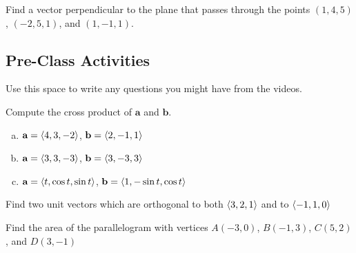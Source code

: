 \documentclass[notes]{subfiles}
\begin{document}
		\begin{ex}
			Find a vector perpendicular to the plane that passes through the points $(1,4,5)$, $(-2,5,1)$, and $(1,-1,1)$.
		\end{ex}
			\newpage
			
	\subsection*{Pre-Class Activities}
		\begin{ex}
			Use this space to write any questions you might have from the videos.
		\end{ex}
			
		\begin{ex}
			Compute the cross product of $\textbf{a}$ and $\textbf{b}$.
			\begin{enumerate}[(a)]
				\item $\textbf{a} = \left\langle 4,3,-2\right\rangle$, $\textbf{b} = \left\langle 2,-1,1\right\rangle$
					
				\item $\textbf{a} = \left\langle 3,3,-3\right\rangle$, $\textbf{b} = \left\langle 3,-3,3\right\rangle$
					
				\item $\textbf{a} = \left\langle t,\cos t,\sin t\right\rangle$, $\textbf{b} = \left\langle 1,-\sin t, \cos t\right\rangle$
			\end{enumerate}
		\end{ex}
		
		\begin{ex}
			Find two unit vectors which are orthogonal to both $\left\langle 3,2,1\right\rangle$ and to $\left\langle -1,1,0\right\rangle$
		\end{ex}
			\vs{1}
			
		\begin{ex}
			Find the area of the parallelogram with vertices $A(-3,0)$, $B(-1,3)$, $C(5,2)$, and $D(3,-1)$
		\end{ex}
			\newpage
			
\end{document}
